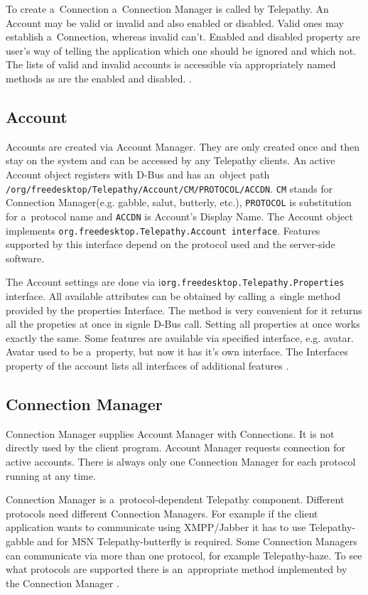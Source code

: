 To create a~Connection a~Connection Manager is called by Telepathy. An Account may be valid or invalid and also enabled or disabled. Valid ones may establish a~Connection, whereas invalid can't. Enabled and disabled property are user's way of telling the application which one should be ignored and which not. The lists of valid and invalid accounts is accessible via appropriately named methods as are the enabled and disabled.  \cite{TPWiki}.

\subsection*{Account}
Accounts are created via Account Manager. They are only created once and then stay on the system and can be accessed by any Telepathy clients. An active Account object registers with D-Bus and has an~object path \verb|/org/freedesktop/Telepathy/Account/CM/PROTOCOL/ACCDN|. \verb|CM| stands for Connection Manager(e.g. gabble, salut, butterly, etc.), \verb|PROTOCOL| is substitution for a~protocol name and \verb|ACCDN| is Account's Display Name. The Account object implements \verb|org.freedesktop.Telepathy.Account interface|. Features supported by this interface depend on the protocol used and the server-side software. 

The Account settings are done via i\verb|org.freedesktop.Telepathy.Properties| interface. All available attributes can be obtained by calling a~single method provided by the properties Interface. The method is very convenient for it returns all the propeties at once in signle D-Bus call. Setting all properties at once works exactly the same. Some features are available via specified interface, e.g. avatar. Avatar used to be a~property, but now it has it's own interface. The Interfaces property of the account lists all interfaces of additional features \cite{TPWiki}.

\subsection*{Connection Manager}
Connection Manager supplies Account Manager with Connections. It is not directly used by the client program. Account Manager requests connection for active accounts. There is always only one Connection Manager for each protocol running at any time.

Connection Manager is a~protocol-dependent Telepathy component. Different protocols need different Connection Managers. For example if the client application wants to communicate using XMPP/Jabber it has to use Telepathy-gabble and for MSN Telepathy-butterfly is required. Some Connection Managers can communicate via more than one protocol, for example Telepathy-haze. To see what protocols are supported there is an~appropriate method implemented by the Connection Manager \cite{TPWiki}.

